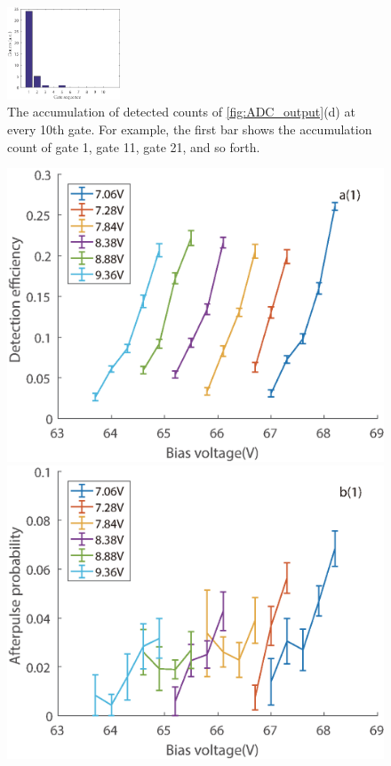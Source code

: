 \documentclass[%
 reprint,
superscriptaddress,
 amsmath,amssymb,
 aps,
]{revtex4-1}
\begin{document}
\begin{figure}
\centering
\includegraphics[width = 0.3\textwidth]{figure/bar-10percent.eps}%
\vskip -0.1in
\caption{\label{fig:counts_bar} The accumulation of detected counts of \autoref{fig:ADC_output}(d) at every 10th gate. For example, the first bar shows the accumulation count of gate 1, gate 11, gate 21, and so forth.}
\vskip -0.2in
\end{figure}

\begin{figure}
\begin{minipage}{0.24\linewidth}
\centering
\includegraphics[width = 1\textwidth]{figure/90M/efficiency.eps}%
\end{minipage}
\begin{minipage}{0.24\linewidth}
\centering
\includegraphics[width = 1\textwidth]{figure/90M/afterpulse0.eps}%

\end{minipage}
\end{figure}
\end{document}
